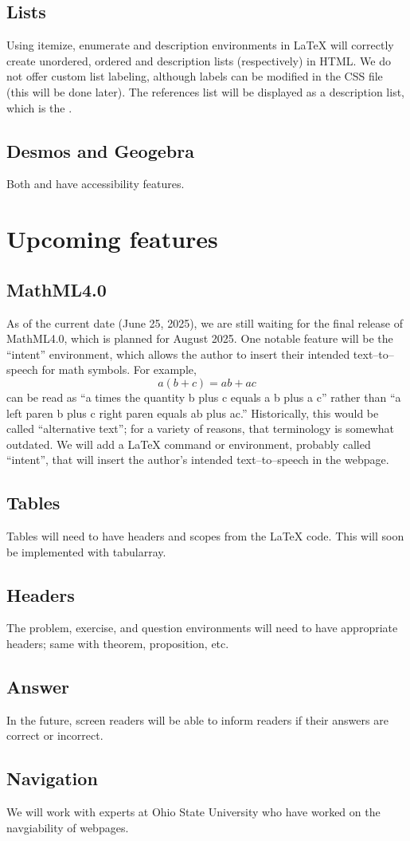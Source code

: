 \documentclass{ximera}
\begin{document}
\subsection{Lists}
Using itemize, enumerate and description environments in LaTeX will correctly create unordered, ordered and description lists (respectively) in HTML. We do not offer custom list labeling, although
labels can be modified in the CSS file (this will be done later). The references list will be displayed as a description list, which is the .

\subsection{Desmos and Geogebra}
Both  and  have accessibility features.


\section{Upcoming features}

\subsection{MathML4.0}
As of the current date (June 25, 2025), we are still waiting for the final release of MathML4.0, which is planned for August 2025.
One notable feature will be the ``intent'' environment, which allows the author to insert their intended text--to--speech for
math symbols. For example, 
\[
a(b+c) = ab + ac
\]
can be read as ``a times the quantity b plus c equals a b plus a c'' rather than ``a left paren b plus c right paren equals ab plus ac.''
Historically, this would be called ``alternative text''; for a variety of reasons, that terminology is somewhat outdated. 
We will add a LaTeX command or environment, probably called ``intent'', that will insert the author's intended text--to--speech in the
webpage. 

\subsection{Tables}
Tables will need to have headers and scopes from the LaTeX code. This will soon be implemented with tabularray. 


\subsection{Headers}
The problem, exercise, and question environments will need to have appropriate headers; same with theorem, proposition, etc. 


\subsection{Answer}
In the future, screen readers will be able to inform readers if their answers are correct or incorrect.  

\subsection{Navigation}
We will work with experts at Ohio State University who have worked on the navgiability of webpages. 
\end{document}
